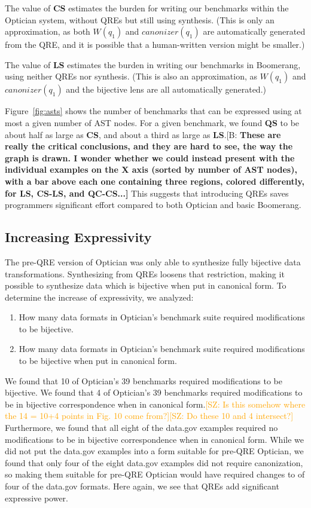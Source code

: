 \documentclass[acmsmall,review,anonymous]{acmart}
\newcommand{\FINISH}[3]{\ifdraft\textcolor{#1}{[#2: #3]}\fi}
\newcommand{\BCP}[1]{\FINISH{dkred}{B}{\bf #1}}
\newcommand{\saz}[1]{\FINISH{orange}{SZ}{#1}}
\newcommand{\kw}[1]{\ensuremath{\mathit{#1}}}
\newcommand{\canonizer}{\ensuremath{\kw{canonizer}}}
\newcommand{\QRESize}{\textbf{QS}}
\newcommand{\CanonizerAndSpecSize}{\textbf{CS}}
\newcommand{\LensAndSpecSize}{\textbf{LS}}
\begin{document}
The value of \CanonizerAndSpecSize{} estimates the burden for writing our
benchmarks within the Optician system, without QREs but still using
synthesis. (This is only an approximation, as both $W(q_1)$ and $\canonizer(q_1)$ are
automatically generated from the QRE, and it is possible that a human-written
version might be smaller.)

The value of \LensAndSpecSize{} estimates the burden in writing our benchmarks
in Boomerang, using neither QREs nor synthesis. (This is also an
approximation, as $W(q_1)$ and $\canonizer(q_1)$ and the bijective lens are all
automatically generated.)

Figure~\ref{fig:asts} shows the number of benchmarks that can be expressed using
at most a given number of AST nodes. For a given benchmark, we found \QRESize{}
to be about half as large as \CanonizerAndSpecSize, and about a third as large
as \LensAndSpecSize{}.\BCP{These are really the critical conclusions, and
  they are hard to see, the way the graph is drawn.  I wonder whether we
  could instead present with the individual examples on the X axis (sorted
  by number of AST nodes), with a bar above each one containing three
  regions, colored differently, for LS, CS-LS, and QC-CS...} This suggests
that introducing QREs saves programmers 
significant effort compared to both Optician and basic Boomerang.

\subsection{Increasing Expressivity}

The pre-QRE version of Optician was only able to synthesize fully bijective data
transformations.  Synthesizing from QREs loosens that restriction, making it
possible to synthesize data which is bijective when put in canonical form. To
determine the increase of expressivity, we analyzed:
\begin{enumerate}
  \item How many data formats in Optician's benchmark suite required modifications
  to be bijective.
  \item How many data formats in Optician's benchmark suite required modifications
  to be bijective when put in canonical form.
\end{enumerate}

We found that 10 of Optician's 39 benchmarks required modifications to be
bijective. We found that 4 of Optician's 39 benchmarks required modifications to
be in bijective correspondence when in canonical form.\saz{Is this somehow where
  the 14 = 10+4 points in Fig. 10 come from?}\saz{Do these 10 and 4 intersect?}
Furthermore, we found that all eight of the data.gov examples required no
modifications to be in bijective correspondence when in canonical form. While we
did not put the data.gov examples into a form suitable for pre-QRE Optician, we
found that only four of the eight data.gov examples did not require
canonization, so making them suitable for pre-QRE Optician would have required 
changes to of four of the data.gov formats.  Here again, we see that QREs add
significant expressive power.
\end{document}
